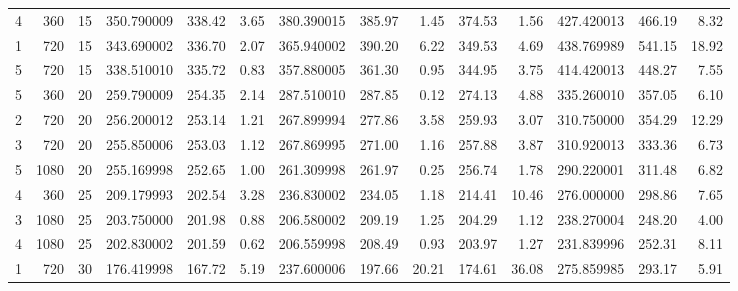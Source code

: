 \begin{tabular}{rrrrrrrrrrrrrr}
     4 &   360 &    15 &    350.790009 &     338.42 &            3.65 &     380.390015 &      385.97 &                 1.45 &         374.53 &                    1.56 &    427.420013 &     466.19 &            8.32 \\
     1 &   720 &    15 &    343.690002 &     336.70 &            2.07 &     365.940002 &      390.20 &                 6.22 &         349.53 &                    4.69 &    438.769989 &     541.15 &           18.92 \\
     5 &   720 &    15 &    338.510010 &     335.72 &            0.83 &     357.880005 &      361.30 &                 0.95 &         344.95 &                    3.75 &    414.420013 &     448.27 &            7.55 \\
     5 &   360 &    20 &    259.790009 &     254.35 &            2.14 &     287.510010 &      287.85 &                 0.12 &         274.13 &                    4.88 &    335.260010 &     357.05 &            6.10 \\
     2 &   720 &    20 &    256.200012 &     253.14 &            1.21 &     267.899994 &      277.86 &                 3.58 &         259.93 &                    3.07 &    310.750000 &     354.29 &           12.29 \\
     3 &   720 &    20 &    255.850006 &     253.03 &            1.12 &     267.869995 &      271.00 &                 1.16 &         257.88 &                    3.87 &    310.920013 &     333.36 &            6.73 \\
     5 &  1080 &    20 &    255.169998 &     252.65 &            1.00 &     261.309998 &      261.97 &                 0.25 &         256.74 &                    1.78 &    290.220001 &     311.48 &            6.82 \\
     4 &   360 &    25 &    209.179993 &     202.54 &            3.28 &     236.830002 &      234.05 &                 1.18 &         214.41 &                   10.46 &    276.000000 &     298.86 &            7.65 \\
     3 &  1080 &    25 &    203.750000 &     201.98 &            0.88 &     206.580002 &      209.19 &                 1.25 &         204.29 &                    1.12 &    238.270004 &     248.20 &            4.00 \\
     4 &  1080 &    25 &    202.830002 &     201.59 &            0.62 &     206.559998 &      208.49 &                 0.93 &         203.97 &                    1.27 &    231.839996 &     252.31 &            8.11 \\
     1 &   720 &    30 &    176.419998 &     167.72 &            5.19 &     237.600006 &      197.66 &                20.21 &         174.61 &                   36.08 &    275.859985 &     293.17 &            5.91 \\

\end{tabular}
